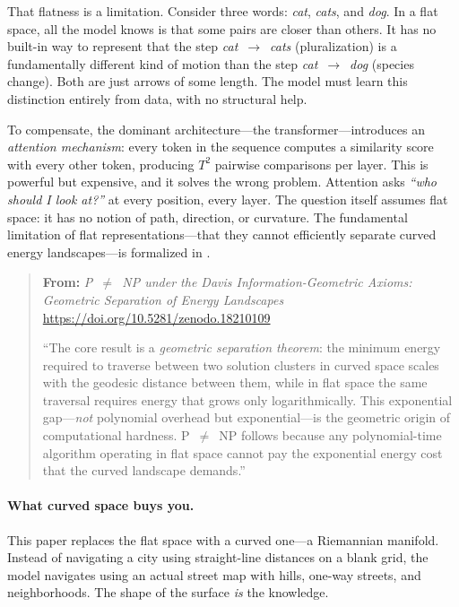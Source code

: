 \documentclass[11pt,a4paper]{article}
\theoremstyle{definition}
\theoremstyle{remark}
\begin{document}
That flatness is a limitation. Consider three words: \emph{cat}, \emph{cats}, and \emph{dog}. In a flat space, all the model knows is that some pairs are closer than others. It has no built-in way to represent that the step \emph{cat}~$\to$~\emph{cats} (pluralization) is a fundamentally different kind of motion than the step \emph{cat}~$\to$~\emph{dog} (species change). Both are just arrows of some length. The model must learn this distinction entirely from data, with no structural help.

To compensate, the dominant architecture---the transformer---introduces an \emph{attention mechanism}: every token in the sequence computes a similarity score with every other token, producing $T^2$ pairwise comparisons per layer. This is powerful but expensive, and it solves the wrong problem. Attention asks \emph{``who should I look at?''} at every position, every layer. The question itself assumes flat space: it has no notion of path, direction, or curvature. The fundamental limitation of flat representations---that they cannot efficiently separate curved energy landscapes---is formalized in \cite{davis2026pnp}.

\begin{quote}
\small
\textbf{From:} \emph{P~$\neq$~NP under the Davis Information-Geometric Axioms: Geometric Separation of Energy Landscapes} \cite{davis2026pnp}\\
\url{https://doi.org/10.5281/zenodo.18210109}

\medskip
``The core result is a \emph{geometric separation theorem}: the minimum energy required to traverse between two solution clusters in curved space scales with the geodesic distance between them, while in flat space the same traversal requires energy that grows only logarithmically. This exponential gap---\emph{not} polynomial overhead but exponential---is the geometric origin of computational hardness. P~$\neq$~NP follows because any polynomial-time algorithm operating in flat space cannot pay the exponential energy cost that the curved landscape demands.''
\end{quote}

\paragraph{What curved space buys you.}
This paper replaces the flat space with a curved one---a Riemannian manifold. Instead of navigating a city using straight-line distances on a blank grid, the model navigates using an actual street map with hills, one-way streets, and neighborhoods. The shape of the surface \emph{is} the knowledge.
\end{document}
